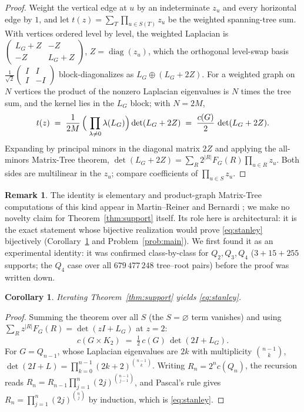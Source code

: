 \documentclass[11pt]{amsart}
\newtheorem{corollary}[theorem]{Corollary}
\theoremstyle{definition}
\newtheorem{remark}[theorem]{Remark}
\begin{document}
\begin{proof}
Weight the vertical edge at $u$ by an indeterminate $z_u$ and every
horizontal edge by $1$, and let $t(z)=\sum_T\prod_{u\in S(T)}z_u$ be the
weighted spanning-tree sum. With vertices ordered level by level, the
weighted Laplacian is
$\left(\begin{smallmatrix} L_G+Z & -Z\\ -Z & L_G+Z \end{smallmatrix}\right)$,
$Z=\operatorname{diag}(z_u)$, which the orthogonal level-swap basis
$\tfrac1{\sqrt2}\left(\begin{smallmatrix} I & I\\ I & -I
\end{smallmatrix}\right)$ block-diagonalizes as $L_G\oplus(L_G+2Z)$. For a
weighted graph on $N$ vertices the product of the nonzero Laplacian
eigenvalues is $N$ times the tree sum, and the kernel lies in the $L_G$
block; with $N = 2M$,
\[
  t(z) \;=\; \frac{1}{2M}\,\Bigl(\;\prod_{\lambda\ne0}\lambda(L_G)\Bigr)
  \det(L_G+2Z)
  \;=\; \frac{c(G)}{2}\,\det(L_G+2Z).
\]
Expanding by principal minors in the diagonal matrix $2Z$ and applying the
all-minors Matrix-Tree theorem,
$\det(L_G+2Z)=\sum_{R}2^{|R|}F_G(R)\prod_{u\in R}z_u$. Both sides are
multilinear in the $z_u$; compare coefficients of $\prod_{u\in S}z_u$.
\end{proof}

\begin{remark}
The identity is elementary and product-graph Matrix-Tree computations of
this kind appear in Martin--Reiner \cite{mr} and Bernardi
\cite[\S4]{bernardi}; we make no novelty claim for
Theorem~\ref{thm:support} itself. Its role here is architectural: it is the
exact statement whose bijective realization would prove
\eqref{eq:stanley} bijectively (Corollary~\ref{cor:telescope} and
Problem~\ref{prob:main}). We first found it as an experimental identity:
it was confirmed class-by-class for $Q_2,Q_3,Q_4$ ($3+15+255$ supports; the
$Q_4$ case over all $679\,477\,248$ tree--root pairs) before the proof was
written down.
\end{remark}

\begin{corollary}\label{cor:telescope}
Iterating Theorem~\ref{thm:support} yields \eqref{eq:stanley}.
\end{corollary}

\begin{proof}
Summing the theorem over all $S$ (the $S=\varnothing$ term vanishes) and
using $\sum_R z^{|R|}F_G(R) = \det(zI+L_G)$ at $z=2$:
\[
  c(G\times K_2) \;=\; \tfrac12\,c(G)\,\det(2I+L_G).
\]
For $G=Q_{n-1}$, whose Laplacian eigenvalues are $2k$ with multiplicity
$\binom{n-1}k$, $\det(2I+L)=\prod_{k=0}^{n-1}(2k+2)^{\binom{n-1}k}$.
Writing $R_n=2^n c(Q_n)$, the recursion reads
$R_n = R_{n-1}\prod_{j=1}^n(2j)^{\binom{n-1}{j-1}}$, and Pascal's rule
gives $R_n=\prod_{j=1}^n(2j)^{\binom nj}$ by induction, which is
\eqref{eq:stanley}.
\end{proof}
\end{document}
